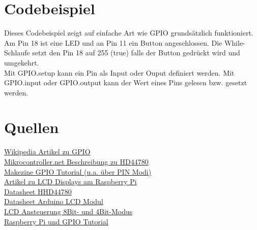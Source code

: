 \documentclass[a4paper,11pt]{article}
\begin{document}
\newpage

\section*{Codebeispiel}
Dieses Codebeispiel zeigt auf einfache Art wie GPIO grundsätzlich funktioniert. Am Pin 18 ist eine LED und an Pin 11 ein Button angeschlossen.
Die While-Schlaufe setzt den Pin 18 auf 255 (true) falls der Button gedrückt wird und umgekehrt.\\


Mit GPIO.setup kann ein Pin als Input oder Ouput definiert werden. Mit GPIO.input oder GPIO.output kann der Wert eines Pins gelesen bzw. gesetzt werden.


\section*{Quellen}
\href{https://en.wikipedia.org/wiki/General-purpose_input/output}{Wikipedia Artikel zu GPIO}\\
\href{http://www.mikrocontroller.net/articles/HD44780}{Mikrocontroller.net Beschreibung zu HD44780}\\
\href{http://makezine.com/projects/tutorial-raspberry-pi-gpio-pins-and-python/}{Makezine GPIO Tutorial (u.a. über PIN Modi)}\\
\href{https://projects.drogon.net/raspberry-pi/gpio-examples/lcd-interface/}{Artikel zu LCD Displays am Raspberry Pi}\\
\href{https://www.sparkfun.com/datasheets/LCD/HD44780.pdf}{Datasheet HHD44780}\\
\href{http://www.protostack.com/download/YJD1602A-1\%20datasheet.pdf}{Datasheet Arduino LCD Modul}\\
\href{http://www.protostack.com/blog/2010/03/character-lcd-displays-part-1/}{LCD Ansteuerung 8Bit- und 4Bit-Modus}\\
\href{http://openmicros.org/index.php/articles/94-ciseco-product-documentation/raspberry-pi/217-getting-started-with-raspberry-pi-gpio-and-python}{Raspberry Pi und GPIO Tutorial}
\end{document}
